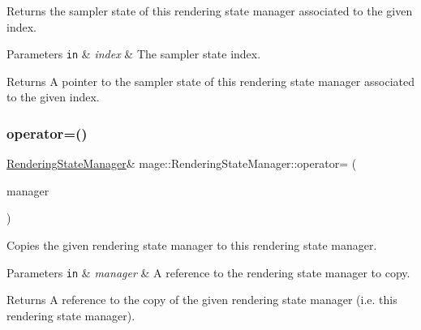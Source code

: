 Returns the sampler state of this rendering state manager associated to the given index.


\begin{DoxyParams}[1]{Parameters}
\mbox{\tt in}  & {\em index} & The sampler state index. \\
\hline
\end{DoxyParams}
\begin{DoxyReturn}{Returns}
A pointer to the sampler state of this rendering state manager associated to the given index. 
\end{DoxyReturn}
\hypertarget{classmage_1_1_rendering_state_manager_a7a0354bd17c097d1504e04ac0b409041}{}\label{classmage_1_1_rendering_state_manager_a7a0354bd17c097d1504e04ac0b409041} 
\subsubsection{\texorpdfstring{operator=()}{operator=()}\hspace{0.1cm}{\footnotesize\ttfamily [1/2]}}
{\footnotesize\ttfamily \hyperlink{classmage_1_1_rendering_state_manager}{Rendering\+State\+Manager}\& mage\+::\+Rendering\+State\+Manager\+::operator= (\begin{DoxyParamCaption}\item[{const \hyperlink{classmage_1_1_rendering_state_manager}{Rendering\+State\+Manager} \&}]{manager }\end{DoxyParamCaption})\hspace{0.3cm}{\ttfamily [delete]}}

Copies the given rendering state manager to this rendering state manager.


\begin{DoxyParams}[1]{Parameters}
\mbox{\tt in}  & {\em manager} & A reference to the rendering state manager to copy. \\
\hline
\end{DoxyParams}
\begin{DoxyReturn}{Returns}
A reference to the copy of the given rendering state manager (i.\+e. this rendering state manager). 
\end{DoxyReturn}
\hypertarget{classmage_1_1_rendering_state_manager_a0863253357334e568f71675c31205671}{}\label{classmage_1_1_rendering_state_manager_a0863253357334e568f71675c31205671} 
